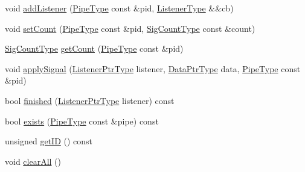 \begin{DoxyCompactItemize}
\item 
void \hyperlink{structvt_1_1pipe_1_1signal_1_1_signal_holder_aee30c3b7c07d695450e1d6a9953ee98a}{add\+Listener} (\hyperlink{namespacevt_ac9852acda74d1896f48f406cd72c7bd3}{Pipe\+Type} const \&pid, \hyperlink{structvt_1_1pipe_1_1signal_1_1_signal_holder_a23af418129e6e8ecb4ee9621e6fd6f90}{Listener\+Type} \&\&cb)
\item 
void \hyperlink{structvt_1_1pipe_1_1signal_1_1_signal_holder_aa15cf43c4602a9d866f8060746696a45}{set\+Count} (\hyperlink{namespacevt_ac9852acda74d1896f48f406cd72c7bd3}{Pipe\+Type} const \&pid, \hyperlink{structvt_1_1pipe_1_1signal_1_1_signal_holder_aced54515f402b63f6dea174e5b027c81}{Sig\+Count\+Type} const \&count)
\item 
\hyperlink{structvt_1_1pipe_1_1signal_1_1_signal_holder_aced54515f402b63f6dea174e5b027c81}{Sig\+Count\+Type} \hyperlink{structvt_1_1pipe_1_1signal_1_1_signal_holder_aefb0dca5bdcb08b867c24b29f1d48429}{get\+Count} (\hyperlink{namespacevt_ac9852acda74d1896f48f406cd72c7bd3}{Pipe\+Type} const \&pid)
\item 
void \hyperlink{structvt_1_1pipe_1_1signal_1_1_signal_holder_a611fe4b2ce38900245e2f4a9dd40d5dc}{apply\+Signal} (\hyperlink{structvt_1_1pipe_1_1signal_1_1_signal_holder_a68114d1ad5804c71e014736b18e41e08}{Listener\+Ptr\+Type} listener, \hyperlink{structvt_1_1pipe_1_1signal_1_1_signal_holder_aad5bfc2b46dfa071ae638385324d7e31}{Data\+Ptr\+Type} data, \hyperlink{namespacevt_ac9852acda74d1896f48f406cd72c7bd3}{Pipe\+Type} const \&pid)
\item 
bool \hyperlink{structvt_1_1pipe_1_1signal_1_1_signal_holder_aa2d3f4de74295a26df20f26e84f99c4e}{finished} (\hyperlink{structvt_1_1pipe_1_1signal_1_1_signal_holder_a68114d1ad5804c71e014736b18e41e08}{Listener\+Ptr\+Type} listener) const
\item 
bool \hyperlink{structvt_1_1pipe_1_1signal_1_1_signal_holder_aeea971b494ab1e9bd716d4a127194ea3}{exists} (\hyperlink{namespacevt_ac9852acda74d1896f48f406cd72c7bd3}{Pipe\+Type} const \&pipe) const
\item 
unsigned \hyperlink{structvt_1_1pipe_1_1signal_1_1_signal_holder_a5a7daec96f1824691dbeefd9567974b9}{get\+ID} () const
\item 
void \hyperlink{structvt_1_1pipe_1_1signal_1_1_signal_holder_abcd78906fca701244f0f13089b5f5057}{clear\+All} ()
\end{DoxyCompactItemize}
